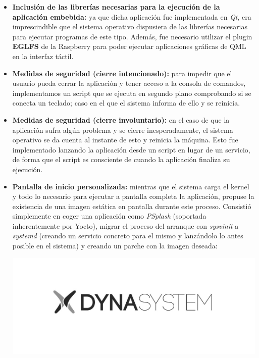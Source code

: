 \documentclass[13pt]{scrartcl}
\begin{document}
				\begin{itemize}
					\item \textbf{Inclusión de las librerías necesarias para la ejecución de la aplicación embebida:} ya que dicha aplicación fue implementada en \textit{Qt}, era imprescindible que el sistema operativo dispusiera de las librerías necesarias para ejecutar programas de este tipo. Además, fue necesario utilizar el plugin \textbf{EGLFS} de la Raspberry para poder ejecutar aplicaciones gráficas de QML en la interfaz táctil.
					\item \textbf{Medidas de seguridad (cierre intencionado):} para impedir que el usuario pueda cerrar la aplicación y tener acceso a la consola de comandos, implementamos un script que se ejecuta en segundo plano comprobando si se conecta un teclado; caso en el que el sistema informa de ello y se reinicia.
					\item \textbf{Medidas de seguridad (cierre involuntario):} en el caso de que la aplicación sufra algún problema y se cierre inesperadamente, el sistema operativo se da cuenta al instante de esto y reinicia la máquina. Esto fue implementado lanzando la aplicación desde un script en lugar de un servicio, de forma que el script es consciente de cuando la aplicación finaliza su ejecución.
					\item \textbf{Pantalla de inicio personalizada:} mientras que el sistema carga el kernel y todo lo necesario para ejecutar a pantalla completa la aplicación, propuse la existencia de una imagen estática en pantalla durante este proceso. Consistió simplemente en coger una aplicación como \textit{PSplash} (soportada inherentemente por Yocto), migrar el proceso del arranque con \textit{sysvinit} a \textit{systemd} (creando un servicio concreto para el mismo y lanzándolo lo antes posible en el sistema) y creando un parche con la imagen deseada:
					
					\begin{center}
						\includegraphics[width=\linewidth]{images/dynasystem.jpeg}
					\end{center}
					

\end{itemize}
\end{document}
